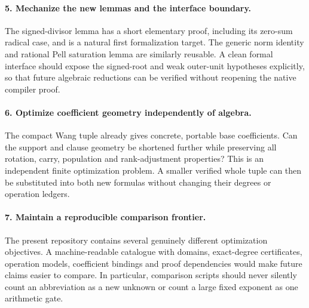 \paragraph{5. Mechanize the new lemmas and the interface boundary.}
The signed-divisor lemma has a short elementary proof, including its
zero-sum radical case, and is a natural first formalization target. The
generic norm identity and rational Pell saturation lemma are similarly
reusable. A clean formal interface should expose the signed-root and weak
outer-unit hypotheses explicitly, so that future algebraic reductions can
be verified without reopening the native compiler proof.

\paragraph{6. Optimize coefficient geometry independently of algebra.}
The compact Wang tuple already gives concrete, portable base coefficients.
Can the support and clause geometry be shortened further while preserving
all rotation, carry, population and rank-adjustment properties? This is an
independent finite optimization problem. A smaller verified whole tuple can
then be substituted into both new formulas without changing their degrees
or operation ledgers.

\paragraph{7. Maintain a reproducible comparison frontier.}
The present repository contains several genuinely different optimization
objectives. A machine-readable catalogue with domains, exact-degree
certificates, operation models, coefficient bindings and proof dependencies
would make future claims easier to compare. In particular, comparison
scripts should never silently count an abbreviation as a new unknown or
count a large fixed exponent as one arithmetic gate.

